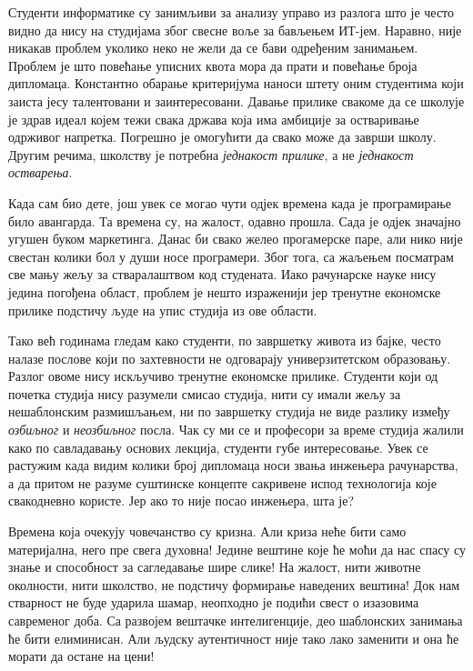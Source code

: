 \documentclass[b5paper]{article}
\begin{document}
Студенти информатике су занимљиви за анализу управо из разлога што је често видно да нису на студијама због свесне воље за бављењем ИТ-јем. Наравно, није никакав проблем уколико неко не жели да се бави одређеним занимањем. Проблем је што повећање уписних квота мора да прати и повећање броја дипломаца. Константно обарање критеријума наноси штету оним студентима који заиста јесу талентовани и заинтересовани. Давање прилике свакоме да се школује је здрав идеал којем тежи свака држава која има амбиције за остваривање одрживог напретка. Погрешно је омогућити да свако може да заврши школу. Другим речима, школству је потребна \textit{једнакост прилике}, а не \textit{једнакост остварења}.

Када сам био дете, још увек се могао чути одјек времена када је програмирање било авангарда. Та времена су, на жалост, одавно прошла. Сада је одјек значајно угушен буком маркетинга. Данас би свако желео прогамерске паре, али нико није свестан колики бол у души носе програмери. Због тога, са жаљењем посматрам све мању жељу за стваралаштвом код студената. Иако рачунарске науке нису једина погођена област, проблем је нешто израженији јер тренутне економске прилике подстичу људе на упис студија из ове области.

Тако већ годинама гледам како студенти, по завршетку живота из бајке, често налазе послове који по захтевности не одговарају универзитетском образовању. Разлог овоме нису искључиво тренутне економске прилике. Студенти који од почетка студија нису разумели смисао студија, нити су имали жељу за нешаблонским размишљањем, ни по завршетку студија не виде разлику између \textit{озбиљног} и \textit{неозбиљног} посла. Чак су ми се и професори за време студија жалили како по савладавању основих лекција, студенти губе интересовање. Увек се растужим када видим колики број дипломаца носи звања инжењера рачунарства, а да притом не разуме суштинске концепте сакривене испод технологија које свакодневно користе. Јер ако то није посао инжењера, шта је?

Времена која очекују човечанство су кризна. Али криза неће бити само материјална, него пре свега духовна! Једине вештине које ће моћи да нас спасу су знање и способност за сагледавање шире слике! На жалост, нити животне околности, нити школство, не подстичу формирање наведених вештина! Док нам стварност не буде ударила шамар, неопходно је подићи свест о изазовима савременог доба. Са развојем вештачке интелигенције, део шаблонских занимања ће бити елиминисан. Али људску аутентичност није тако лако заменити и она ће морати да остане на цени!
\end{document}
